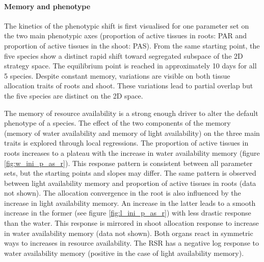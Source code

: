 \paragraph{Memory and phenotype}

The kinetics of the phenotypic shift is first visualised for one parameter set on the two main phenotypic axes (proportion of active tissues in roots: PAR and proportion of active tissues in the shoot: PAS). From the same starting point, the five species show a distinct rapid shift toward segregated subspace of the 2D strategy space. The equilibrium point is reached in approximately 10 days for all 5 species. Despite constant memory, variations are visible on both tissue allocation traits of roots and shoot. These variations lead to partial overlap but the five species are distinct on the 2D space.

The memory of resource availability is a strong enough driver to alter the default phenotype of a species. The effect of the two components of the memory (memory of water availability and memory of light availability) on the three main traits is explored through local regressions. The proportion of active tissues in roots increases to a plateau with the increase in water availability memory (figure \ref{fig:w_ini_p_as_r}). This response pattern is consistent between all parameter sets, but the starting points and slopes may differ. The same pattern is observed between light availability memory and proportion of active tissues in roots (data not shown). The allocation convergence in the root is also influenced by the increase in light availability memory. An increase in the latter leads to a smooth increase in the former (see figure \ref{fig:l_ini_p_as_r}) with less drastic response than the water. This response is mirrored in shoot allocation response to increase in water availability memory (data not shown). Both organs react in symmetric ways to increases in resource availability. The RSR has a negative log response to water availability memory (positive in the case of light availability memory).

